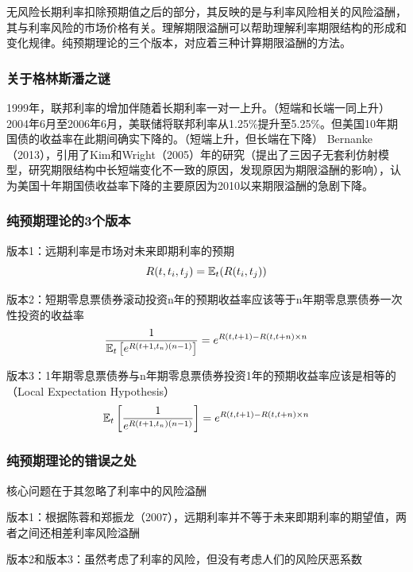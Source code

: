 \documentclass[11pt]{article}
\begin{document}
无风险长期利率扣除预期值之后的部分，其反映的是与利率风险相关的风险溢酬，其与利率风险的市场价格有关。理解期限溢酬可以帮助理解利率期限结构的形成和变化规律。纯预期理论的三个版本，对应着三种计算期限溢酬的方法。

\subsubsection{关于格林斯潘之谜}

1999年，联邦利率的增加伴随着长期利率一对一上升。（短端和长端一同上升）
2004年6月至2006年6月，美联储将联邦利率从1.25\%提升至5.25\%。但美国10年期国债的收益率在此期间确实下降的。（短端上升，但长端在下降）
Bernanke（2013），引用了Kim和Wright（2005）年的研究（提出了三因子无套利仿射模型，研究期限结构中长短端变化不一致的原因，发现原因为期限溢酬的影响），认为美国十年期国债收益率下降的主要原因为2010以来期限溢酬的急剧下降。

\subsubsection{纯预期理论的3个版本}

版本1：远期利率是市场对未来即期利率的预期
\begin{equation*}
	R(t,t_i,t_j) = \mathbb{E}_t(R(t_i,t_j))
\end{equation*}

版本2：短期零息票债券滚动投资n年的预期收益率应该等于n年期零息票债券一次性投资的收益率
\begin{equation*}
	\frac{1}{\mathbb{E}_t\left[e^{R(t+1,t_n)(n-1)}\right]} = e^{R(t,t+1)-R(t,t+n)\times n}
\end{equation*}

版本3：1年期零息票债券与n年期零息票债券投资1年的预期收益率应该是相等的（Local Expectation Hypothesis）
\begin{equation*}
	\mathbb{E}_t \left[\frac{1}{e^{R(t+1,t_n)(n-1)}}\right] = e^{R(t,t+1)-R(t,t+n)\times n}
\end{equation*}

\subsubsection{纯预期理论的错误之处}

核心问题在于其忽略了利率中的风险溢酬

版本1：根据陈蓉和郑振龙（2007），远期利率并不等于未来即期利率的期望值，两者之间还相差利率风险溢酬

版本2和版本3：虽然考虑了利率的风险，但没有考虑人们的风险厌恶系数
\end{document}
